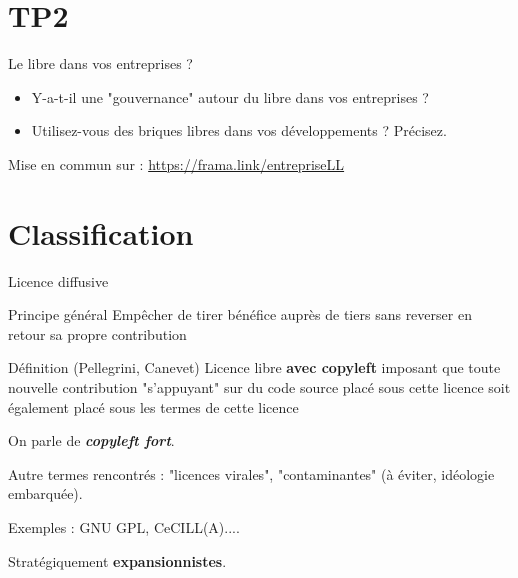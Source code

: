 \documentclass{beamer}
\begin{document}
\section{TP2}

\begin{frame}{Le libre dans vos entreprises ?}

  \begin{itemize}
  \item Y-a-t-il une "gouvernance" autour du libre dans vos
    entreprises ?
  \item Utilisez-vous des briques libres dans vos développements ? Précisez.
  \end{itemize}
Mise en commun sur :
\url{https://frama.link/entrepriseLL}
  
\end{frame}




\section{Classification}


\begin{frame}{Licence diffusive}

  \begin{block}{Principe général}
    Empêcher de tirer bénéfice auprès de tiers sans reverser en retour sa propre contribution    
  \end{block}

  \begin{alertblock}{Définition (Pellegrini, Canevet)}
    Licence libre \textbf{avec copyleft} imposant que toute nouvelle contribution "s'appuyant" sur du code source placé sous cette licence soit également placé sous les termes de cette licence
   \end{alertblock}

On parle de \textit{\textbf{copyleft fort}}.

Autre termes rencontrés : "licences virales", "contaminantes" (à éviter, idéologie embarquée).
  
Exemples : GNU GPL, CeCILL(A)....

Stratégiquement \textbf{expansionnistes}.
\end{frame}
\end{document}
